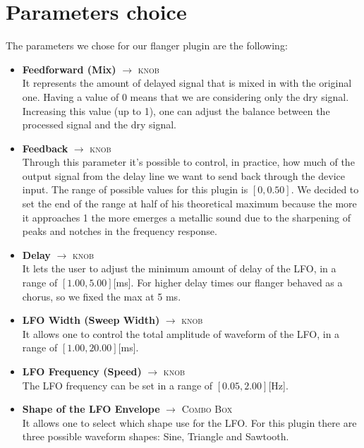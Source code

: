 \documentclass[a4paper,12pt]{report}
\begin{document}
\section{Parameters choice}
The parameters we chose for our flanger plugin are the following:
\begin{itemize}
\item \textbf{Feedforward (Mix)} $\rightarrow$ \textsc{knob}
\\It represents the amount of delayed signal that is mixed in with the original one. Having a value of 0 means that we are considering only the dry signal. Increasing this value (up to 1), one can adjust the balance between the processed signal and the dry signal.
\item \textbf{Feedback} $\rightarrow$ \textsc{knob}
\\Through this parameter it's possible to control, in practice, how much of the output signal from the delay line we want to send back through the device input. The range of possible values for this plugin is $[0, 0.50]$. We decided to set the end of the range at half of his theoretical maximum because the more it approaches 1 the more emerges a metallic sound due to the sharpening of peaks and notches in the frequency response.
\item \textbf{Delay} $\rightarrow$ \textsc{knob}
\\It lets the user to adjust the minimum amount of delay of the LFO, in a range of $[1.00, 5.00]$[ms]. For higher delay times our flanger behaved as a chorus, so we fixed the max at 5 ms.
\item \textbf{LFO Width (Sweep Width)} $\rightarrow$ \textsc{knob}
\\It allows one to control the total amplitude of waveform of the LFO, in a range of $[1.00, 20.00]$[ms].
\item \textbf{LFO Frequency (Speed)} $\rightarrow$ \textsc{knob}
\\The LFO frequency can be set in a range of $[0.05, 2.00]$[Hz].
\item \textbf{Shape of the LFO Envelope} $\rightarrow$ \textsc{Combo Box}
\\It allows one to select which shape use for the LFO. For this plugin there are three possible waveform shapes: Sine, Triangle and Sawtooth.
\end{itemize}
\end{document}
